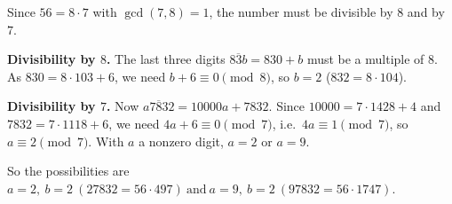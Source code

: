 Since $56=8\cdot7$ with $\gcd(7,8)=1$, the number must be divisible by $8$ and by $7$.

\textbf{Divisibility by $8$.} The last three digits $\overline{83b}=830+b$ must be a multiple of $8$. As $830=8\cdot103+6$, we need $b+6\equiv0\pmod 8$, so $b=2$ ($832=8\cdot104$).

\textbf{Divisibility by $7$.} Now $\overline{a7832}=10000a+7832$. Since $10000=7\cdot1428+4$ and $7832=7\cdot1118+6$, we need $4a+6\equiv0\pmod7$, i.e.\ $4a\equiv1\pmod 7$, so $a\equiv2\pmod7$. With $a$ a nonzero digit, $a=2$ or $a=9$.

So the possibilities are $\boxed{a=2,\ b=2\ (27832=56\cdot497)\ \text{and}\ a=9,\ b=2\ (97832=56\cdot1747)}$.
